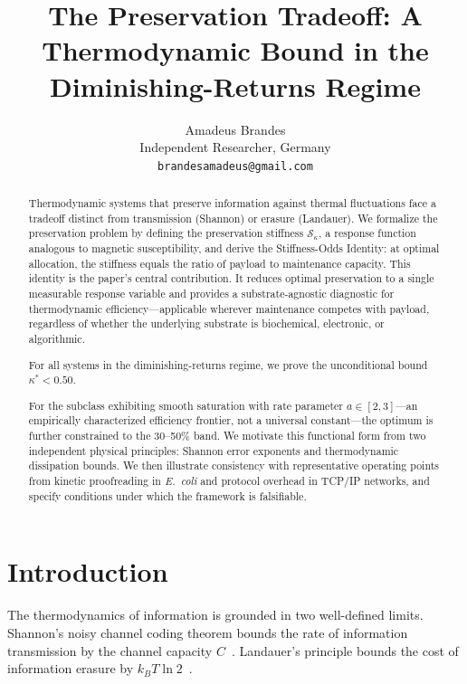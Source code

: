 \documentclass[11pt,twocolumn]{article}
\title{The Preservation Tradeoff: A Thermodynamic Bound in the Diminishing-Returns Regime}
\author{Amadeus Brandes\\
Independent Researcher, Germany\\
\texttt{brandesamadeus@gmail.com}}
\date{}
\begin{document}
\maketitle

\begin{abstract}
Thermodynamic systems that preserve information against thermal fluctuations face a tradeoff distinct from transmission (Shannon) or erasure (Landauer). We formalize the preservation problem by defining the preservation stiffness $\mathcal{S}_\kappa$, a response function analogous to magnetic susceptibility, and derive the Stiffness-Odds Identity: at optimal allocation, the stiffness equals the ratio of payload to maintenance capacity. This identity is the paper's central contribution. It reduces optimal preservation to a single measurable response variable and provides a substrate-agnostic diagnostic for thermodynamic efficiency---applicable wherever maintenance competes with payload, regardless of whether the underlying substrate is biochemical, electronic, or algorithmic.

For all systems in the diminishing-returns regime, we prove the unconditional bound $\kappa^* < 0.50$.

For the subclass exhibiting smooth saturation with rate parameter $a \in [2,3]$---an empirically characterized efficiency frontier, not a universal constant---the optimum is further constrained to the 30--50\% band. We motivate this functional form from two independent physical principles: Shannon error exponents and thermodynamic dissipation bounds. We then illustrate consistency with representative operating points from kinetic proofreading in \textit{E.~coli} and protocol overhead in TCP/IP networks, and specify conditions under which the framework is falsifiable.
\end{abstract}

\section{Introduction}

The thermodynamics of information is grounded in two well-defined limits. Shannon's noisy channel coding theorem bounds the rate of information transmission by the channel capacity $C$~\cite{Shannon1948}. Landauer's principle bounds the cost of information erasure by $k_B T \ln 2$~\cite{Landauer1961}.
\end{document}
